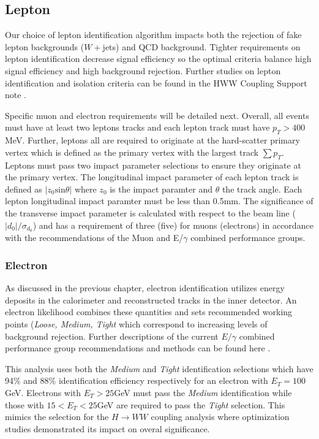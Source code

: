 \subsection{Lepton}

Our choice of lepton identification algorithm impacts both the rejection of fake lepton backgrounds ($W+$jets) and QCD background. Tighter requirements on lepton identification decrease signal efficiency so the optimal criteria balance high signal efficiency and high background rejection. Further studies on lepton identification and isolation criteria can be found in the HWW Coupling Support note \cite{HWWCoupling}.

Specific muon and electron requirements will be detailed next. Overall, all events must have at least two leptons tracks and each lepton track must have $p_T>400$MeV. Further, leptons all are required to originate at the hard-scatter primary vertex which is defined as the primary vertex with the largest track $\sum p_T$. Leptons must pass two impact parameter selections to ensure they originate at the primary vertex. The longitudinal impact parameter of each lepton track is defined as $|z_0\mathrm{sin}\theta|$ where $z_0$ is the impact paramter and $\theta$ the track angle. Each lepton longitudinal impact paramter must be less than 0.5mm. The significance of the transverse impact parameter is calculated with respect to the beam line ($|d_0|/\sigma_{d_0}$) and has a requirement of three (five) for muons (electrons) in accordance with the recommendations of the Muon and E/$\gamma$ combined performance groups. 

\subsubsection{Electron}
As discussed in the previous chapter, electron identification utilizes energy deposits in the calorimeter and reconstructed tracks in the inner detector. An electron likelihood combines these quantities and sets recommended working points (\textit{Loose, Medium, Tight} which correspond to increasing levels of background rejection. Further descriptions of the current $E/\gamma$ combined performance group recommendations and methods can be found here \cite{ATL-PHYS-PUB-2015-041}.

This analysis uses both the \textit{Medium} and \textit{Tight} identification selections which have 94\% and 88\% identification efficiency respectively for an electron with $E_T=100$ GeV. Electrons with $E_T>25$GeV must pass the \textit{Medium} identification while those with $15<E_T<25$GeV are required to pass the \textit{Tight} selection. This mimics the selection for the $H\rightarrow WW$ coupling analysis where optimization studies demonstrated its impact on overal significance. 

